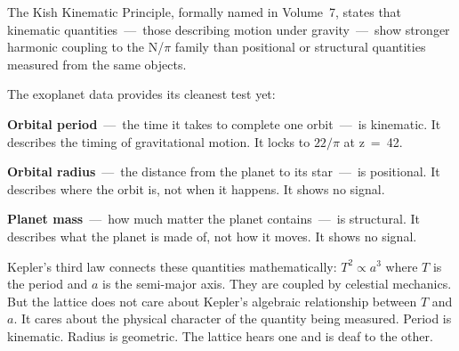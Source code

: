 \documentclass[11pt, letterpaper, openany]{book}
\begin{document}
The Kish Kinematic Principle, formally named in Volume~7, states that kinematic
quantities~---~those describing motion under gravity~---~show stronger harmonic
coupling to the N/$\pi$ family than positional or structural quantities measured
from the same objects.

The exoplanet data provides its cleanest test yet:

\textbf{Orbital period}~---~the time it takes to complete one orbit~---~is kinematic.
It describes the timing of gravitational motion. It locks to $22/\pi$ at z~=~42.

\textbf{Orbital radius}~---~the distance from the planet to its star~---~is
positional. It describes where the orbit is, not when it happens. It shows no signal.

\textbf{Planet mass}~---~how much matter the planet contains~---~is structural.
It describes what the planet is made of, not how it moves. It shows no signal.

Kepler's third law connects these quantities mathematically: $T^2 \propto a^3$ where
$T$ is the period and $a$ is the semi-major axis. They are coupled by celestial
mechanics. But the lattice does not care about Kepler's algebraic relationship
between $T$ and $a$. It cares about the physical character of the quantity being
measured. Period is kinematic. Radius is geometric. The lattice hears one and is
deaf to the other.
\end{document}
